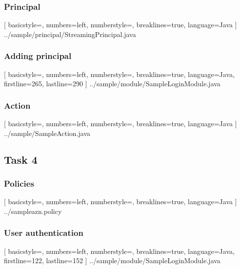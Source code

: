 \documentclass{article}
\begin{document}
\subsubsection{Principal}

[
	basicstyle=\footnotesize,
	numbers=left,
	numberstyle=\tiny,
	breaklines=true,
	language=Java
]
{../sample/principal/StreamingPrincipal.java}

\subsubsection{Adding principal}

[
	basicstyle=\footnotesize,
	numbers=left,
	numberstyle=\tiny,
	breaklines=true,
	language=Java,
	firstline=265,
	lastline=290
]
{../sample/module/SampleLoginModule.java}

\subsubsection{Action}

[
	basicstyle=\footnotesize,
	numbers=left,
	numberstyle=\tiny,
	breaklines=true,
	language=Java
]
{../sample/SampleAction.java}

\subsection{Task 4}

\subsubsection{Policies}

[
	basicstyle=\footnotesize,
	numbers=left,
	numberstyle=\tiny,
	breaklines=true,
	language=Java
]
{../sampleazn.policy}

\subsubsection{User authentication}

[
	basicstyle=\footnotesize,
	numbers=left,
	numberstyle=\tiny,
	breaklines=true,
	language=Java,
	firstline=122,
	lastline=152
]
{../sample/module/SampleLoginModule.java}
\end{document}
